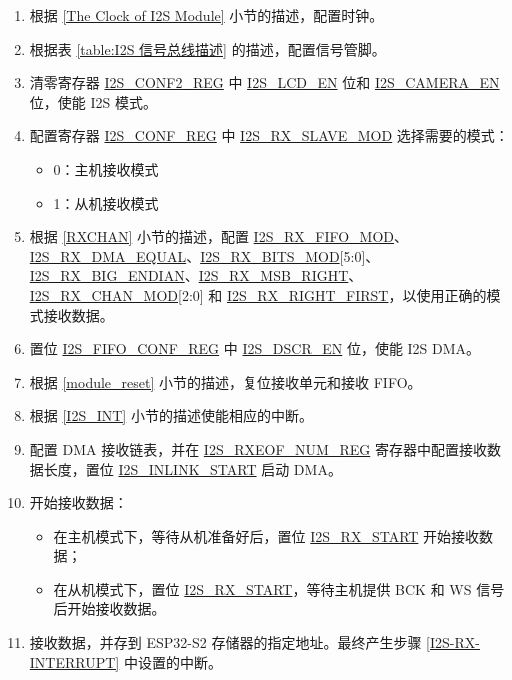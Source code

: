 \documentclass[main\_\_CN.tex]{subfiles}
\begin{document}
\begin{enumerate}
    \item 根据 \ref{The Clock of I2S Module} 小节的描述，配置时钟。

    \item 根据表 \ref{table:I2S 信号总线描述} 的描述，配置信号管脚。

    \item 清零寄存器 \hyperref[regdesc:I2SCONF2REG]{I2S\_CONF2\_REG} 中 \hyperref[fielddesc:I2SLCDEN]{I2S\_LCD\_EN} 位和 \hyperref[fielddesc:I2SCAMERAEN]{I2S\_CAMERA\_EN} 位，使能 I2S 模式。
    \item 配置寄存器 \hyperref[regdesc:I2SCONFREG]{I2S\_CONF\_REG} 中 \hyperref[fielddesc:I2SRXSLAVEMOD]{I2S\_RX\_SLAVE\_MOD} 选择需要的模式：
    \begin{itemize}
        \item 0：主机接收模式
        \item 1：从机接收模式
    \end{itemize}

    \item 根据 \ref{RXCHAN} 小节的描述，配置 \hyperref[fielddesc:I2SRXFIFOMOD]{I2S\_RX\_FIFO\_MOD}、\hyperref[fielddesc:I2SRXDMAEQUAL]{I2S\_RX\_DMA\_EQUAL}、\hyperref[fielddesc:I2SRXBITSMOD]{I2S\_RX\_BITS\_MOD}[5:0]、\hyperref[fielddesc:I2SRXBIGENDIAN]{I2S\_RX\_BIG\_ENDIAN}、\hyperref[fielddesc:I2SRXMSBRIGHT]{I2S\_RX\_MSB\_RIGHT}、\hyperref[fielddesc:I2SRXCHANMOD]{I2S\_RX\_CHAN\_MOD}[2:0] 和 \hyperref[fielddesc:I2SRXRIGHTFIRST]{I2S\_RX\_RIGHT\_FIRST}，以使用正确的模式接收数据。

    \item 置位 \hyperref[regdesc:I2SFIFOCONFREG]{I2S\_FIFO\_CONF\_REG} 中 \hyperref[fielddesc:I2SDSCREN]{I2S\_DSCR\_EN} 位，使能 I2S DMA。
    \item 根据 \ref{module_reset} 小节的描述，复位接收单元和接收 FIFO。
    \item 根据 \ref{I2S_INT} 小节的描述使能相应的中断。\label{I2S-RX-INTERRUPT}

    \item 配置 DMA 接收链表，并在 \hyperref[regdesc:I2SRXEOFNUMREG]{I2S\_RXEOF\_NUM\_REG} 寄存器中配置接收数据长度，置位 \hyperref[fielddesc:I2SINLINKSTART]{I2S\_INLINK\_START} 启动 DMA。

    \item 开始接收数据：
    \begin{itemize}
        \item 在主机模式下，等待从机准备好后，置位 \hyperref[fielddesc:I2SRXSTART]{I2S\_RX\_START} 开始接收数据；
        \item 在从机模式下，置位 \hyperref[fielddesc:I2SRXSTART]{I2S\_RX\_START}，等待主机提供 BCK 和 WS 信号后开始接收数据。
    \end{itemize}
    \item 接收数据，并存到 ESP32-S2 存储器的指定地址。最终产生步骤 \ref{I2S-RX-INTERRUPT} 中设置的中断。
\end{enumerate}
\end{document}

